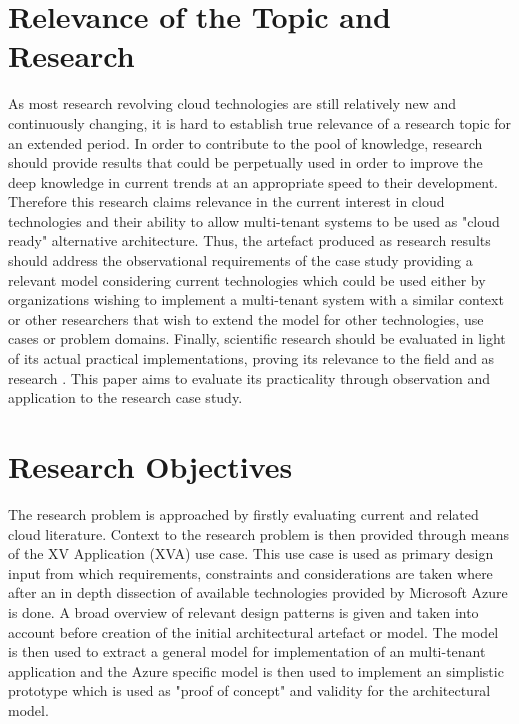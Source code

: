\section{Relevance of the Topic and Research}

As most research revolving cloud technologies are still relatively new and continuously changing, it is hard to establish true relevance of a research topic for an extended period. In order to contribute to the pool of knowledge, research should provide results that could be perpetually used in order to improve the deep knowledge in current trends at an appropriate speed to their development. Therefore this research claims relevance in the current interest in cloud technologies and their ability to allow multi-tenant systems to be used as "cloud ready" alternative architecture. Thus, the artefact produced as research results should address the observational requirements of the case study providing a relevant model considering current technologies which could be used either by organizations wishing to implement a multi-tenant system with a similar context or other researchers that wish to extend the model for other technologies, use cases or problem domains. Finally, scientific research should be evaluated in light of its actual practical implementations, proving its relevance to the field and as research \cite{Hevner2004}. This paper aims to evaluate its practicality through observation and application to the research case study.


\section{Research Objectives}

The research problem is approached by firstly evaluating current and related cloud literature. Context to the research problem is then provided through means of the XV Application (XVA) use case. This use case is used as primary design input from which requirements, constraints and considerations are taken where after an in depth dissection of available technologies provided by Microsoft Azure is done. A broad overview of relevant design patterns is given and taken into account before creation of the initial architectural artefact or model. The model is then used to extract a general model for implementation of an multi-tenant application and the Azure specific model is then used to implement an simplistic prototype which is used as "proof of concept" and validity for the architectural model.

